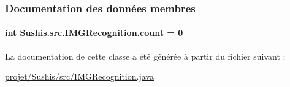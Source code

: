 \subsubsection{Documentation des données membres}
\hypertarget{classSushis_1_1src_1_1IMGRecognition_a9e17ec11c72a8a5d30ee00c827d7bbeb}{}
\paragraph[{count}]{\setlength{\rightskip}{0pt plus 5cm}int Sushis.\+src.\+I\+M\+G\+Recognition.\+count = 0\hspace{0.3cm}{\ttfamily [static]}}\label{classSushis_1_1src_1_1IMGRecognition_a9e17ec11c72a8a5d30ee00c827d7bbeb}


La documentation de cette classe a été générée à partir du fichier suivant \+:\begin{DoxyCompactItemize}
\item 
\hyperlink{projet_2Sushis_2src_2IMGRecognition_8java}{projet/\+Sushis/src/\+I\+M\+G\+Recognition.\+java}\end{DoxyCompactItemize}
